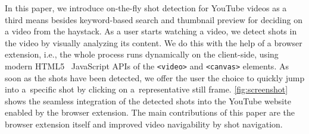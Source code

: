 \documentclass{acm_proc_article-sp}
\begin{document}

In this paper, we introduce on-the-fly shot detection for YouTube videos as a third means besides keyword-based search and thumbnail preview for deciding on a video from the haystack. As a user starts watching a video, we detect shots in the video by visually analyzing its content. We do this with the help of a browser extension, i.e., the whole process runs dynamically on the client-side, using modern HTML5~\cite{w3c_html5} JavaScript APIs of the \texttt{<video>} and \texttt{<canvas>} elements. As soon as the shots have been detected, we offer the user the choice to quickly jump into a~specific shot by clicking on a~representative still frame. \autoref{fig:screenshot} shows the seamless integration of the detected shots into the YouTube website enabled by the browser extension. The main contributions of this paper are the browser extension itself and improved video navigability by shot navigation.

\end{document}
